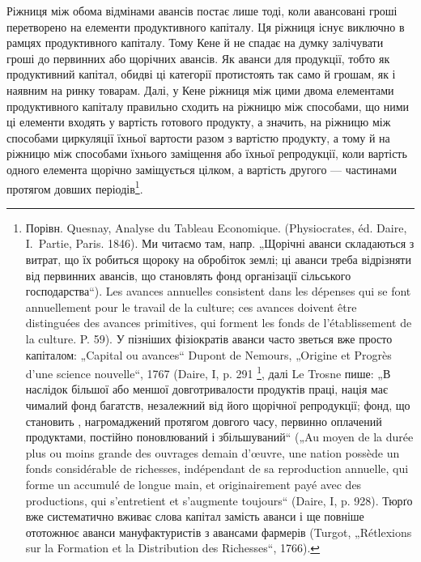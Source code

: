 Ріжниця між обома відмінами авансів постає лише тоді, коли авансовані
гроші перетворено на елементи продуктивного капіталу. Ця ріжниця
існує виключно в рамцях продуктивного капіталу. Тому Кене й не спадає
на думку залічувати гроші до первинних або щорічних авансів. Як аванси
для продукції, тобто як продуктивний капітал, обидві ці категорії протистоять
так само й грошам, як і наявним на ринку товарам. Далі, у Кене
ріжниця між цими двома елементами продуктивного капіталу правильно
сходить на ріжницю між способами, що ними ці елементи входять у вартість
готового продукту, а значить, на ріжницю між способами циркуляції
їхньої вартости разом з вартістю продукту, а тому й на ріжницю
між способами їхнього заміщення або їхньої репродукції, коли вартість
одного елемента щорічно заміщується цілком, а вартість другого — частинами
протягом довших періодів\footnote{
Порівн. Quesnay, Analyse du Tableau Economique. (Physiocrates, éd. Daire,
I.~Partie, Paris. 1846). Ми читаємо там, напр. „Щорічні аванси складаються з витрат,
що їх робиться щороку на обробіток землі; ці аванси треба відрізняти від первинних
авансів, що становлять фонд організації сільського господарства“). Les
avances annuelles consistent dans les dépenses qui se font annuellement pour le
travail de la culture; ces avances doivent être distinguées des avances primitives,
qui forment les fonds de l’établissement de la culture. P. 59). У пізніших фізіократів
аванси часто зветься вже просто капіталом: „Capital ou avances“ Dupont de
Nemours, „Origine et Progrès d’une science nouvelle“, 1767 (Daire, I, p. 291 \footnote*{
Цитоване місце є не в статті „Origine et Progrès“, 1767 (Daire, I, p. 291),
a в статті „Maximes du docteur Quesnay“ (Daire, I, p. 391). \emph{Ред.}
},
далі Le Trosne пише: „В наслідок більшої або меншої довготривалости продуктів
праці, нація має чималий фонд багатств, незалежний від його щорічної
репродукції; фонд, що становить , нагромаджений протягом довгого
часу, первинно оплачений продуктами, постійно поновлюваний і збільшуваний“
(„Au moyen de la durée plus ou moins grande des ouvrages demain d'œuvre, une
nation possède un fonds considérable de richesses, indépendant de sa reproduction
annuelle, qui forme un  accumulé de longue main, et originairement payé
avec des productions, qui s'entretient et s’augmente toujours“ (Daire, I, p. 928).
Тюрґо вже систематично вживає слова капітал замість аванси і ще повніше ототожнює
аванси мануфактуристів з авансами фармерів (Turgot, „Rétlexions sur la
Formation et la Distribution des Richesses“, 1766).
}.


